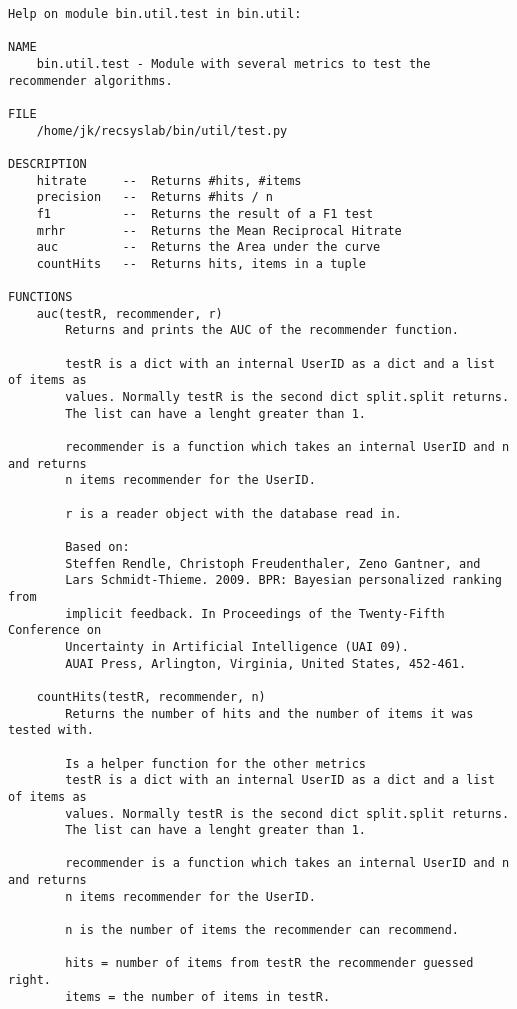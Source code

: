 \begin{lstlisting}
Help on module bin.util.test in bin.util:

NAME
    bin.util.test - Module with several metrics to test the recommender algorithms.

FILE
    /home/jk/recsyslab/bin/util/test.py

DESCRIPTION
    hitrate     --  Returns #hits, #items
    precision   --  Returns #hits / n
    f1          --  Returns the result of a F1 test
    mrhr        --  Returns the Mean Reciprocal Hitrate
    auc         --  Returns the Area under the curve
    countHits   --  Returns hits, items in a tuple

FUNCTIONS
    auc(testR, recommender, r)
        Returns and prints the AUC of the recommender function.
        
        testR is a dict with an internal UserID as a dict and a list of items as
        values. Normally testR is the second dict split.split returns.
        The list can have a lenght greater than 1.
        
        recommender is a function which takes an internal UserID and n and returns
        n items recommender for the UserID.
        
        r is a reader object with the database read in.
        
        Based on:
        Steffen Rendle, Christoph Freudenthaler, Zeno Gantner, and
        Lars Schmidt-Thieme. 2009. BPR: Bayesian personalized ranking from
        implicit feedback. In Proceedings of the Twenty-Fifth Conference on
        Uncertainty in Artificial Intelligence (UAI 09).
        AUAI Press, Arlington, Virginia, United States, 452-461.
    
    countHits(testR, recommender, n)
        Returns the number of hits and the number of items it was tested with.
        
        Is a helper function for the other metrics
        testR is a dict with an internal UserID as a dict and a list of items as
        values. Normally testR is the second dict split.split returns.
        The list can have a lenght greater than 1.
        
        recommender is a function which takes an internal UserID and n and returns
        n items recommender for the UserID.
        
        n is the number of items the recommender can recommend.
        
        hits = number of items from testR the recommender guessed right.
        items = the number of items in testR.
        

\end{lstlisting}
